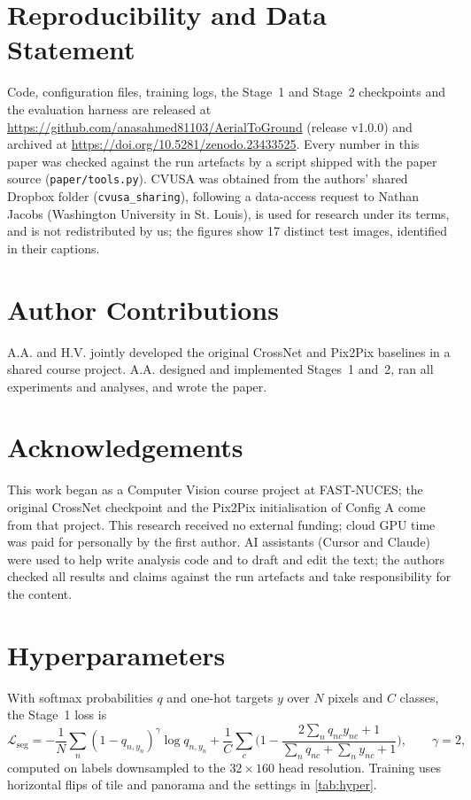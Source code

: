 \documentclass[11pt]{article}
\begin{document}
\section*{Reproducibility and Data Statement}
Code, configuration files, training logs, the Stage~1 and Stage~2 checkpoints and the evaluation harness are
released at \url{https://github.com/anasahmed81103/AerialToGround} (release v1.0.0) and archived at
\url{https://doi.org/10.5281/zenodo.23433525}. Every number in this paper was checked against the run
artefacts by a script shipped with the paper source (\texttt{paper/tools.py}). CVUSA was obtained from the
authors' shared Dropbox folder (\texttt{cvusa\_sharing}), following a data-access request to Nathan Jacobs
(Washington University in St. Louis), is used for research under its terms, and is not redistributed by us; the
figures show \num{17} distinct test images, identified in their captions.

\section*{Author Contributions}
A.A. and H.V. jointly developed the original CrossNet and Pix2Pix baselines in a shared course project. A.A.
designed and implemented Stages~1 and~2, ran all experiments and analyses, and wrote the paper.

\section*{Acknowledgements}
This work began as a Computer Vision course project at FAST-NUCES; the original CrossNet checkpoint and the
Pix2Pix initialisation of Config A come from that project. This research received no external funding; cloud
GPU time was paid for personally by the first author. AI assistants (Cursor and Claude)
were used to help write analysis code and to draft and edit the text; the authors checked all results and
claims against the run artefacts and take responsibility for the content.

\appendix

\section{Hyperparameters}
\label{app:hyper}

With softmax probabilities $q$ and one-hot targets $y$ over $N$ pixels and $C$ classes, the Stage~1 loss is
\begin{equation}
  \mathcal{L}_{\mathrm{seg}}=-\frac{1}{N}\sum_{n}(1-q_{n,y_n})^{\gamma}\log q_{n,y_n}
  +\frac{1}{C}\sum_{c}\Big(1-\frac{2\sum_n q_{nc}y_{nc}+1}{\sum_n q_{nc}+\sum_n y_{nc}+1}\Big),
  \qquad \gamma=2,
  \label{eq:s1loss}
\end{equation}
computed on labels downsampled to the $32\times160$ head resolution. Training uses horizontal flips of tile and
panorama and the settings in \cref{tab:hyper}.
\end{document}

